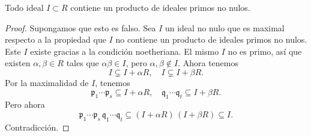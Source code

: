 \begin{lema}
  Todo ideal $I \subset R$ contiene un producto de ideales primos no nulos.

  \begin{proof}
    Supongamos que esto es falso. Sea $I$ un ideal no nulo que es maximal
    respecto a la propiedad que $I$ no contiene un producto de ideales primos
    no nulos. Este $I$ existe gracias a la condición noetheriana. El mismo $I$
    no es primo, así que existen $\alpha,\beta \in R$ tales que
    $\alpha\beta \in I$, pero $\alpha,\beta \notin I$. Ahora tenemos
    $$I \subsetneq I + \alpha R, \quad I \subsetneq I + \beta R.$$
    Por la maximalidad de $I$, tenemos
    \[ \mathfrak{p}_1\cdots\mathfrak{p}_s \subseteq I + \alpha R, \quad
       \mathfrak{q}_1\cdots\mathfrak{q}_t \subseteq I + \beta R. \]
    Pero ahora
    \[ \mathfrak{p}_1\cdots\mathfrak{p}_s\,\mathfrak{q}_1\cdots\mathfrak{q}_t
       \subseteq (I + \alpha R)\,(I + \beta R) \subseteq I. \]
    Contradicción.
  \end{proof}
\end{lema}

